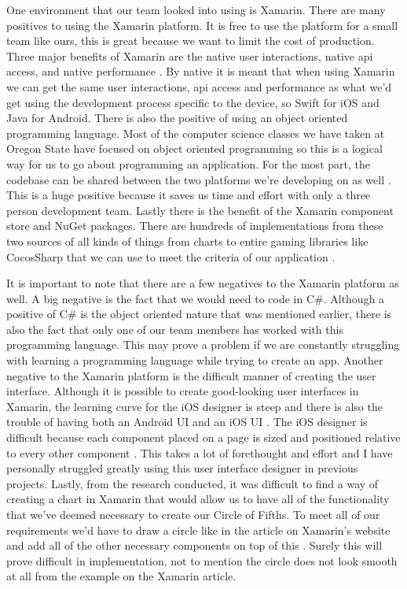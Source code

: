 \documentclass[onecolumn, draftclsnofoot,10pt, compsoc]{IEEEtran}
\begin{document}
One environment that our team looked into using is Xamarin.
There are many positives to using the Xamarin platform.
It is free to use the platform for a small team like ours, this is great because we want to limit the cost of production.
Three major benefits of Xamarin are the native user interactions, native api access, and native performance \cite{xamarin}.
By native it is meant that when using Xamarin we can get the same user interactions, api access and performance as what we'd get using the development process specific to the device, so Swift for iOS and Java for Android.
There is also the positive of using an object oriented programming language.
Most of the computer science classes we have taken at Oregon State have focused on object oriented programming so this is a logical way for us to go about programming an application.
For the most part, the codebase can be shared between the two platforms we're developing on as well \cite{xamarin}.
This is a huge positive because it saves us time and effort with only a three person development team.
Lastly there is the benefit of the Xamarin component store and NuGet packages.
There are hundreds of implementations from these two sources of all kinds of things from charts to entire gaming libraries like CocosSharp that we can use to meet the criteria of our application \cite{cocossharp}. 

It is important to note that there are a few negatives to the Xamarin platform as well.
A big negative is the fact that we would need to code in C\#.
Although a positive of C\# is the object oriented nature that was mentioned earlier, there is also the fact that only one of our team members has worked with this programming language.
This may prove a problem if we are constantly struggling with learning a programming language while trying to create an app.
Another negative to the Xamarin platform is the difficult manner of creating the user interface.
Although it is possible to create good-looking user interfaces in Xamarin, the learning curve for the iOS designer is steep and there is also the trouble of having both an Android UI and an iOS UI \cite{xamarinui}.
The iOS designer is difficult because each component placed on a page is sized and positioned relative to every other component \cite{xamarinui}.
This takes a lot of forethought and effort and I have personally struggled greatly using this user interface designer in previous projects.
Lastly, from the research conducted, it was difficult to find a way of creating a chart in Xamarin that would allow us to have all of the functionality that we've deemed necessary to create our Circle of Fifths.
To meet all of our requirements we'd have to draw a circle like in the article on Xamarin's website and add all of the other necessary components on top of this \cite{xamarincircle}.
Surely this will prove difficult in implementation, not to mention the circle does not look smooth at all from the example on the Xamarin article.
\end{document}
